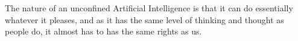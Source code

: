 The nature of an unconfined Artificial Intelligence is that it can do essentially whatever it pleases, and as it has the same level of thinking and thought as people do, it almost has to has the same rights as us.